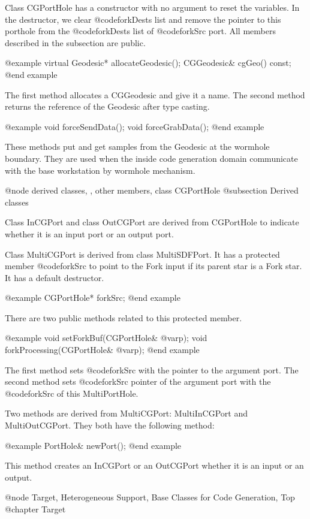 Class CGPortHole has a constructor with no argument to reset the variables.
In the destructor, we clear @code{forkDests} list and remove the pointer
to this porthole from the @code{forkDests} list of @code{forkSrc} port.
All members described in the subsection are public.

@example
virtual Geodesic* allocateGeodesic();
CGGeodesic& cgGeo() const;
@end example

The first method allocates a CGGeodesic and give it a name.
The second method returns the reference of the Geodesic after type casting.

@example
void forceSendData();
void forceGrabData();
@end example

These methods put and get samples from the Geodesic at the wormhole
boundary. They are used when the inside code generation domain
communicate with the base workstation by wormhole mechanism.

@node derived classes, , other members, class CGPortHole
@subsection Derived classes

Class InCGPort and class OutCGPort are derived from CGPortHole to indicate
whether it is an input port or an output port.

Class MultiCGPort is derived from class MultiSDFPort. It has a protected
member @code{forkSrc} to point to the Fork input if its parent star
is a Fork star. It has a default destructor.

@example
CGPortHole* forkSrc;
@end example

There are two public methods related to this protected member.

@example
void setForkBuf(CGPortHole& @var{p});
void forkProcessing(CGPortHole& @var{p});
@end example

The first method sets @code{forkSrc} with the pointer to the argument port.
The second method sets @code{forkSrc} pointer of the argument port with
the @code{forkSrc} of this MultiPortHole.

Two methods are derived from MultiCGPort: MultiInCGPort and MultiOutCGPort.
They both have the following method:

@example
PortHole& newPort();
@end example

This method creates an InCGPort or an OutCGPort whether it is an input or an
output.

@node Target, Heterogeneous Support, Base Classes for Code Generation, Top
@chapter Target

